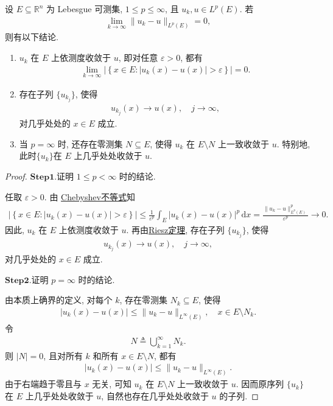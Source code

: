 \documentclass[../../main.tex]{subfiles}%
\begin{document}
\begin{corollary}\label{corollary:Lp收敛必存在子列几乎处处收敛}
设 $E\subseteq\mathbb{R}^{n}$ 为 Lebesgue 可测集, $1\leqslant p\leqslant\infty$, 且 $u_k,u\in L^{p}(E)$. 若
\begin{align*}
\lim\limits_{k\to\infty}\|u_k-u\|_{L^{p}(E)}=0,
\end{align*}
则有以下结论.
\begin{enumerate}[(1)]
\item $u_k$ 在 $E$ 上依测度收敛于 $u$, 即对任意 $\varepsilon>0$, 都有
\begin{align*}
\lim\limits_{k\to\infty}
\left|\left\{x\in E:|u_k(x)-u(x)|>\varepsilon\right\}\right|=0.
\end{align*}
\item 存在子列 $\{u_{k_j}\}$, 使得
\begin{align*}
u_{k_j}(x)\longrightarrow u(x),\quad j\to\infty,
\end{align*}
对几乎处处的 $x\in E$ 成立.
\item 当 $p=\infty$ 时, 还存在零测集 $N\subseteq E$, 使得 $u_k$ 在 $E\setminus N$ 上一致收敛于 $u$. 特别地, 此时$\{u_k\}$在 $E$ 上几乎处处收敛于 $u$.
\end{enumerate}
\end{corollary}
\begin{proof}
\noindent$\mathbf{Step}\bm{1}.${\heiti 证明 $1\leqslant p<\infty$ 时的结论.}

任取 $\varepsilon>0$. 由 \hyperref[theorem:实分析-Beppo Levi单调收敛定理]{Chebyshev不等式}知
\begin{align*}
\left|\left\{x\in E:|u_k(x)-u(x)|>\varepsilon\right\}\right|
\leqslant \frac{1}{\varepsilon^{p}}
\int_E|u_k(x)-u(x)|^{p}\,\mathrm{d}x
=\frac{\|u_k-u\|_{L^{p}(E)}^{p}}{\varepsilon^{p}}
\longrightarrow 0.
\end{align*}
因此, $u_k$ 在 $E$ 上依测度收敛于 $u$.
再由\hyperref[theorem:Riesz定理]{Riesz定理}, 存在子列 $\{u_{k_j}\}$, 使得
\begin{align*}
u_{k_j}(x)\longrightarrow u(x),\quad j\to\infty,
\end{align*}
对几乎处处的 $x\in E$ 成立.

\noindent$\mathbf{Step}\bm{2}.${\heiti 证明 $p=\infty$ 时的结论.}

由本质上确界的定义, 对每个 $k$, 存在零测集 $N_k\subseteq E$, 使得
\begin{align*}
|u_k(x)-u(x)|
\leqslant\|u_k-u\|_{L^{\infty}(E)},\quad x\in E\setminus N_k.
\end{align*}
令
\begin{align*}
N\triangleq\bigcup\limits_{k=1}^{\infty}N_k.
\end{align*}
则 $|N|=0$, 且对所有 $k$ 和所有 $x\in E\setminus N$, 都有
\begin{align*}
|u_k(x)-u(x)|
\leqslant\|u_k-u\|_{L^{\infty}(E)}.
\end{align*}
由于右端趋于零且与 $x$ 无关, 可知 $u_k$ 在 $E\setminus N$ 上一致收敛于 $u$. 因而原序列 $\{u_k\}$ 在 $E$ 上几乎处处收敛于 $u$, 自然也存在几乎处处收敛于 $u$ 的子列.
\end{proof}
\end{document}
